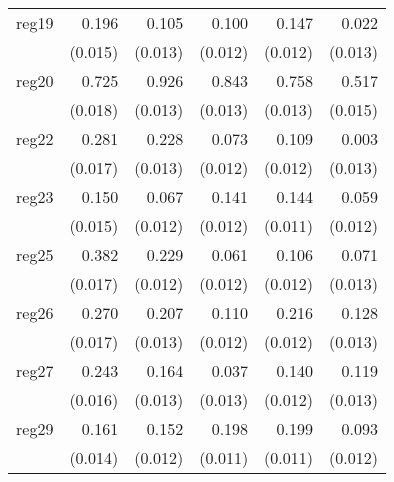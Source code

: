{\begin{longtable}{l*{5}{D{.}{.}{-1}}}
\addlinespace
reg19       &       0.196\sym{***}&       0.105\sym{***}&       0.100\sym{***}&       0.147\sym{***}&       0.022         \\
            &     (0.015)         &     (0.013)         &     (0.012)         &     (0.012)         &     (0.013)         \\
\addlinespace
reg20       &       0.725\sym{***}&       0.926\sym{***}&       0.843\sym{***}&       0.758\sym{***}&       0.517\sym{***}\\
            &     (0.018)         &     (0.013)         &     (0.013)         &     (0.013)         &     (0.015)         \\
\addlinespace
reg22       &       0.281\sym{***}&       0.228\sym{***}&       0.073\sym{***}&       0.109\sym{***}&       0.003         \\
            &     (0.017)         &     (0.013)         &     (0.012)         &     (0.012)         &     (0.013)         \\
\addlinespace
reg23       &       0.150\sym{***}&       0.067\sym{***}&       0.141\sym{***}&       0.144\sym{***}&       0.059\sym{***}\\
            &     (0.015)         &     (0.012)         &     (0.012)         &     (0.011)         &     (0.012)         \\
\addlinespace
reg25       &       0.382\sym{***}&       0.229\sym{***}&       0.061\sym{***}&       0.106\sym{***}&       0.071\sym{***}\\
            &     (0.017)         &     (0.012)         &     (0.012)         &     (0.012)         &     (0.013)         \\
\addlinespace
reg26       &       0.270\sym{***}&       0.207\sym{***}&       0.110\sym{***}&       0.216\sym{***}&       0.128\sym{***}\\
            &     (0.017)         &     (0.013)         &     (0.012)         &     (0.012)         &     (0.013)         \\
\addlinespace
reg27       &       0.243\sym{***}&       0.164\sym{***}&       0.037\sym{**} &       0.140\sym{***}&       0.119\sym{***}\\
            &     (0.016)         &     (0.013)         &     (0.013)         &     (0.012)         &     (0.013)         \\
\addlinespace
reg29       &       0.161\sym{***}&       0.152\sym{***}&       0.198\sym{***}&       0.199\sym{***}&       0.093\sym{***}\\
            &     (0.014)         &     (0.012)         &     (0.011)         &     (0.011)         &     (0.012)         \\

\end{longtable}}
